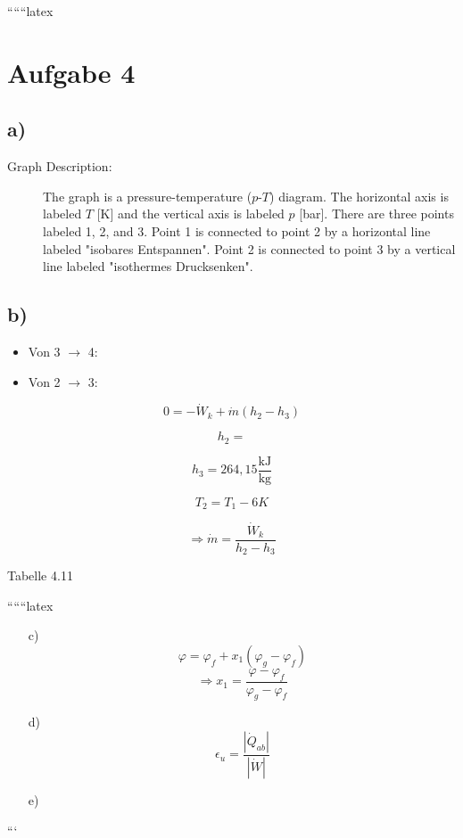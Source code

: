 
``````latex


\section*{Aufgabe 4}

\subsection*{a)}

\begin{description}
    \item[Graph Description:] The graph is a pressure-temperature ($p$-$T$) diagram. The horizontal axis is labeled $T$ [K] and the vertical axis is labeled $p$ [bar]. There are three points labeled 1, 2, and 3. Point 1 is connected to point 2 by a horizontal line labeled "isobares Entspannen". Point 2 is connected to point 3 by a vertical line labeled "isothermes Drucksenken".
\end{description}

\subsection*{b)}

\begin{itemize}
    \item Von 3 $\rightarrow$ 4:
    \item Von 2 $\rightarrow$ 3:
\end{itemize}

\[
0 = -\dot{W}_k + \dot{m} (h_2 - h_3)
\]

\[
h_2 = 
\]

\[
h_3 = 264{,}15 \frac{\text{kJ}}{\text{kg}}
\]

\[
T_2 = T_1 - 6K
\]

\[
\Rightarrow \dot{m} = \frac{\dot{W}_k}{h_2 - h_3}
\]

\begin{flushright}
    Tabelle 4.11
\end{flushright}

``````latex


\begin{itemize}
    \item[c)]
    \begin{equation}
        \varphi = \varphi_f + x_1 \left( \varphi_g - \varphi_f \right)
    \end{equation}
    \begin{equation}
        \Rightarrow x_1 = \frac{\varphi - \varphi_f}{\varphi_g - \varphi_f}
    \end{equation}
    
    \item[d)]
    \begin{equation}
        \epsilon_u = \frac{\left| \dot{Q}_{ab} \right|}{\left| \dot{W} \right|}
    \end{equation}
    
    \item[e)]
\end{itemize}

```